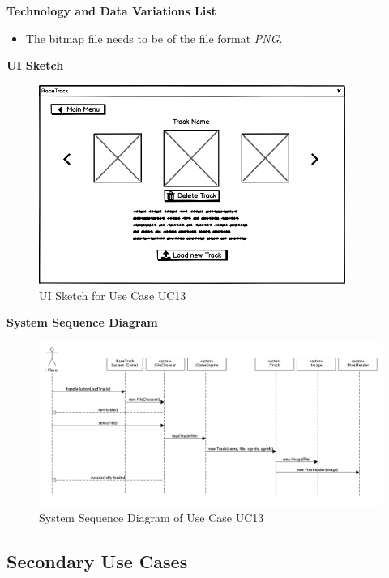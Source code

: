 			\textbf{Technology and Data Variations List}
				\begin{itemize}
					\item The bitmap file needs to be of the file format \textit{PNG}.
				\end{itemize}

			\textbf{UI Sketch}
				\begin{figure}[H]
					\centering
					\includegraphics[width=10cm,keepaspectratio,center]{img/Use-Case-Model_UC13_UI-Sketch.png}
					\caption{UI Sketch for Use Case UC13}
				\end{figure}

			\newpage

			\textbf{System Sequence Diagram}
				\begin{figure}[H]
					\centering
					\includegraphics[width=18cm,keepaspectratio,center]{img/Use-Case-Model_UC13_System-Sequence-Diagram.png}
					\caption{System Sequence Diagram of Use Case UC13}
				\end{figure}

	\newpage

	\subsection{Secondary Use Cases}

